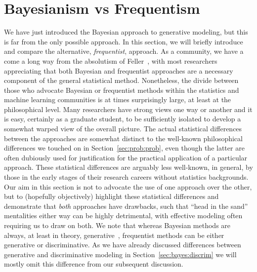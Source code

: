 
\section{Bayesianism vs Frequentism}
\label{sec:bayes:religions}

We have just introduced the Bayesian approach to generative modeling, but this is far from
the only possible approach.  In this section, we will briefly introduce and compare the alternative, \emph{frequentist}, approach.
As a community, we have a come a long way from the absolutism of Feller~\citep{feller1950introduction,gelman2013not}, with most researchers appreciating that
both Bayesian and frequentist approaches are a necessary component of the general statistical method.
Nonetheless, the divide between those
who advocate Bayesian or frequentist methods within the statistics and machine learning communities
is at times surprisingly large, at least at the philosophical level.  Many researchers
have strong views one way or another and it is easy, certainly as a graduate student,
to be sufficiently isolated to develop a somewhat warped view of the overall picture.
The actual statistical differences between the approaches are somewhat distinct to the 
well-known philosophical differences we touched
on in Section~\ref{sec:prob:prob}, even though the latter are often dubiously used for justification 
for the practical application of a particular approach. These statistical differences are arguably
less well-known, in general, by those in the early stages of their research careers without statistics
backgrounds.
Our aim in this section is not to advocate the use of one approach over the other, but to (hopefully objectively)
highlight these statistical differences and demonstrate that \emph{both} approaches have drawbacks, such that ``head in the sand''
mentalities either way can be highly detrimental, with effective modeling often requiring us to draw
on both.
We note that whereas Bayesian methods are always, at least in theory, generative~\citep[Section~14.1]{gelman2014bayesian},
frequentist methods can be either generative or discriminative. 
As we have already discussed differences between generative and
discriminative modeling in Section~\ref{sec:bayes:discrim} we will mostly omit this difference from our subsequent discussion.

